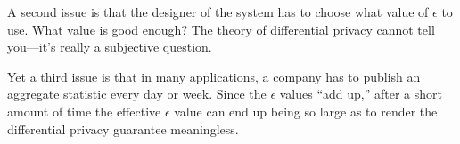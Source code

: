 A second issue is that the designer of the system has to choose
what value of $\epsilon$ to use. What value is good enough?
The theory of differential privacy cannot tell you---it's
really a subjective question.

Yet a third issue is that in many applications, a company has
to publish an aggregate statistic every day or week.
Since the $\epsilon$ values ``add up,'' after a short amount
of time the effective $\epsilon$ value can end up being
so large as to render the differential privacy guarantee
meaningless.

\iffalse
\section{The exponential mechanism}

For certain statistics, there are much better mechanisms than 
the Laplace mechanism.
For example, say that we want to publish the most popular name
in a dataset.
Doing this with the Laplace mechanism to

A different way of achieving differential privacy 

\fi


